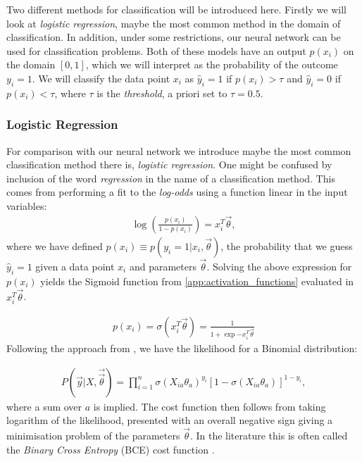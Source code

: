     Two different methods for classification will be introduced here. Firstly we will look at \textit{logistic regression}, maybe the most common method in the domain of classification. In addition, under some restrictions, our neural network can be used for classification problems. Both of these models have an output $p(x_i)$ on the domain $[0,1]$, which we will interpret as the probability of the outcome $y_i = 1$. We will classify the data point $x_i$ as $\hat{y}_i = 1$ if $p(x_i) > \tau$ and $\hat{y}_i = 0$ if $p(x_i) < \tau$, where $\tau$ is the \textit{threshold}, a priori set to $\tau = 0.5$. 

    \subsubsection{Logistic Regression}
        For comparison with our neural network we introduce maybe the most common classification method there is, \textit{logistic regression}. One might be confused by inclusion of the word \textit{regression} in the name of a classification method. This comes from performing a fit to the \textit{log-odds} using a function linear in the input variables:
        \begin{align*}
            \log(\frac{p(x_i)}{1-p(x_i)}) = x_i^T \vec{\theta},
        \end{align*}
        where we have defined $p(x_i) \equiv p(y_i = 1 | x_i, \vec{\theta})$, the probability that we guess $\hat{y}_i = 1$ given a data point $x_i$ and parameters $\vec{\theta}$. Solving the above expression for $p(x_i)$ yields the Sigmoid function from \cref{app:activation_functions} evaluated in $x_i^T \vec{\theta}$. 
        
        \begin{align*}
            p(x_i) = \sigma(x_i^T \vec{\theta}) = \frac{1}{1+\exp{-x_i^T\vec{\theta}}}
        \end{align*}
        Following the approach from \cite{Project1}, we have the likelihood for a Binomial distribution:      

        \begin{align*}
            P(\vec{y}|X,\vec{\vec{\theta}}) = \prod_{i = 1}^{n} \sigma(X_{ia} \theta_a)^{y_i}[1-\sigma(X_{ia}\theta_a)]^{1 - y_i},
        \end{align*}
        where a sum over $a$ is implied. The cost function then follows from taking logarithm of the likelihood, presented with an overall negative sign giving a minimisation problem of the parameters $\vec{\theta}$. In the literature this is often called the \textit{Binary Cross Entropy} (BCE) cost function \cite{BCE}.  

